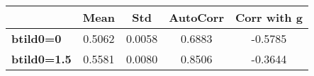 \begin{tiny}\begin{tabular}{|l|c|c|c|c|}
\hline
&\textbf{Mean}&\textbf{Std}&\textbf{AutoCorr}&\textbf{Corr with g}\\\hline
\textbf{btild0=0}&0.5062&0.0058&0.6883&-0.5785\\\hline
\textbf{btild0=1.5}&0.5581&0.0080&0.8506&-0.3644\\\hline
\end{tabular}
\end{tiny}